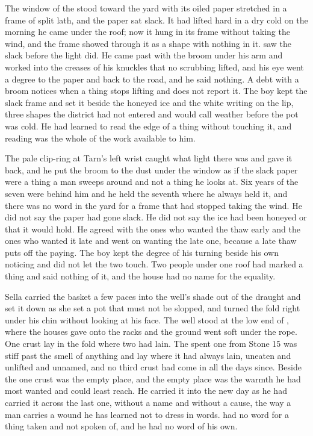 The window of the  stood toward the yard with its oiled paper stretched in a frame of split lath, and the paper sat slack. It had lifted hard in a dry cold on the morning he came under the roof; now it hung in its frame without taking the wind, and the frame showed through it as a shape with nothing in it.  saw the slack before the light did. He came past with the broom under his arm and  worked into the creases of his knuckles that no scrubbing lifted, and his eye went a degree to the paper and back to the road, and he said nothing. A debt with a broom notices when a thing stops lifting and does not report it. The boy kept the slack frame and set it beside the honeyed ice and the white writing on the lip, three shapes the district had not entered and would call weather before the pot was cold. He had learned to read the edge of a thing without touching it, and reading was the whole of the work available to him.

The pale clip-ring at Tarn's left wrist caught what light there was and gave it back, and he put the broom to the dust under the window as if the slack paper were a thing a man sweeps around and not a thing he looks at. Six years of the seven were behind him and he held the seventh where he always held it, and there was no word in the yard for a frame that had stopped taking the wind. He did not say the paper had gone slack. He did not say the ice had been honeyed or that it would hold. He agreed with the ones who wanted the thaw early and the ones who wanted it late and went on wanting the late one, because a late thaw puts off the paying. The boy kept the degree of his turning beside his own noticing and did not let the two touch. Two people under one roof had marked a thing and said nothing of it, and the house had no name for the equality.

\scenebreak

Sella carried the basket a few paces into the well's shade out of the draught and set it down as she set a pot that must not be slopped, and turned the fold right under his chin without looking at his face. The well stood at the low end of , where the houses gave onto the racks and the ground went soft under the rope. One crust lay in the fold where two had lain. The spent one from Stone 15 was stiff past the smell of anything and lay where it had always lain, uneaten and unlifted and unnamed, and no third crust had come in all the days since. Beside the one crust was the empty place, and the empty place was the warmth he had most wanted and could least reach. He carried it into the new day as he had carried it across the last one, without a name and without a cause, the way a man carries a wound he has learned not to dress in words.  had no word for a thing taken and not spoken of, and he had no word of his own.


